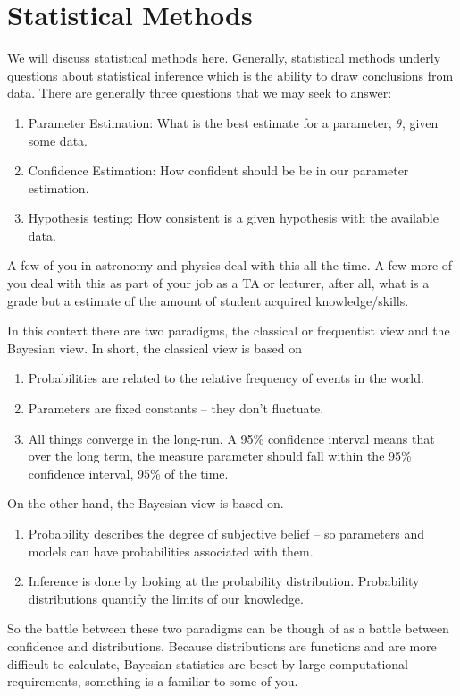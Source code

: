 \section{Statistical Methods}

We will discuss statistical methods here.  Generally, statistical methods underly questions about statistical inference which is the ability to draw conclusions from data.  There are generally three questions that we may seek to answer:
\begin{enumerate}
  \item Parameter Estimation: What is the best estimate for a parameter, $\theta$, given some data.
  \item Confidence Estimation: How confident should be be in our parameter estimation.
  \item Hypothesis testing: How consistent is a given hypothesis with the available data.
\end{enumerate}
A few of you in astronomy and physics deal with this all the time.  A few more of you deal with this as part of your job as a TA or lecturer, after all, what is a grade but a estimate of the amount of student acquired knowledge/skills. 

In this context there are two paradigms, the classical or frequentist view and the Bayesian view.  In short, the classical view is based on 
\begin{enumerate}
  \item Probabilities are related to the relative frequency of events in the world. 
  \item Parameters are fixed constants -- they don't fluctuate.
  \item All things converge in the long-run.  A 95\% confidence interval means that over the long term, the measure parameter should fall within the 95\% confidence interval, 95\% of the time.
\end{enumerate}

On the other hand, the Bayesian view is based on.
\begin{enumerate}
  \item Probability describes the degree of subjective belief -- so parameters and models can have probabilities associated with them.
  \item Inference is done by looking at the probability distribution.  Probability distributions quantify the limits of our knowledge.
\end{enumerate}

So the battle between these two paradigms can be though of as a battle between confidence and distributions.  Because distributions are functions and are more difficult to calculate, Bayesian statistics are beset by large computational requirements, something is a familiar to some of you. 


